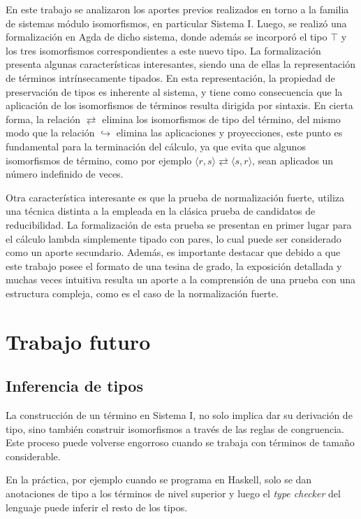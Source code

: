 En este trabajo se analizaron los aportes previos realizados en torno a la familia de sistemas módulo isomorfismos, en particular Sistema I.
Luego, se realizó una formalización en Agda de dicho sistema, donde además se incorporó el tipo $\top$ y los tres isomorfismos correspondientes a este nuevo tipo.
La formalización presenta algunas características interesantes, siendo una de ellas la representación de términos intrínsecamente tipados.
En esta representación, la propiedad de preservación de tipos es inherente al sistema, y tiene como consecuencia que la aplicación de los isomorfismos de términos resulta dirigida por sintaxis.
En cierta forma, la relación $\rightleftarrows$ elimina los isomorfismos de tipo del término, del mismo modo que la relación $\hookrightarrow$ elimina las aplicaciones y proyecciones, este punto es fundamental para la terminación del cálculo, ya que evita que algunos isomorfismos de término, como por ejemplo $\langle r,s \rangle\rightleftarrows\langle s,r \rangle$, sean aplicados un número indefinido de veces.

Otra característica interesante es que la prueba de normalización fuerte, utiliza una técnica distinta a la empleada en la clásica prueba de candidatos de reducibilidad.
La formalización de esta prueba se presentan en primer lugar para el cálculo lambda simplemente tipado con pares, lo cual puede ser considerado como un aporte secundario.
Además, es importante destacar que debido a que este trabajo posee el formato de una tesina de grado, la exposición detallada y muchas veces intuitiva resulta un aporte a la comprensión de una prueba con una estructura compleja, como es el caso de la normalización fuerte.

\section{Trabajo futuro}

\subsection{Inferencia de tipos}

La construcción de un término en Sistema I, no solo implica dar su derivación de tipo, sino también construir isomorfismos a través de las reglas de congruencia.
Este proceso puede volverse engorroso cuando se trabaja con términos de tamaño considerable.

En la práctica, por ejemplo cuando se programa en Haskell, solo se dan anotaciones de tipo a los términos de nivel superior y luego el \textit{type checker} del lenguaje puede inferir el resto de los tipos.

